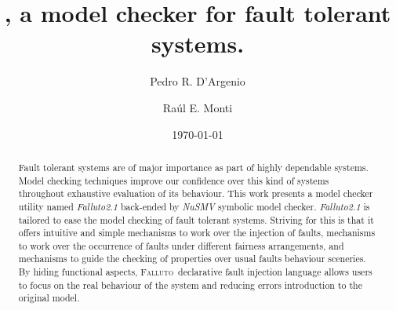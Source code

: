 \documentclass[12pt]{llncs2e/llncs}
\title{\falluto, a model checker for fault tolerant systems.}
\author{ Pedro R. D'Argenio \and Ra\'ul E. Monti}
\institute{FaMAF, Universidad Nacional de C\'ordoba -- CONICET}
\date{\today}
\newcommand{\fallutoSp}{\mbox{\textsc{Falluto~}}}
\begin{document}
\maketitle
\begin{abstract}
Fault tolerant systems are of major importance as part of highly dependable 
systems. Model checking techniques improve our confidence over this kind of
systems throughout exhaustive evaluation of its behaviour. This work presents
a model checker utility named \mbox{\textit{Falluto2.1}} back-ended by 
\mbox{\textit{NuSMV}} symbolic model checker. \mbox{\textit{Falluto2.1}} is
tailored to ease the model checking of fault tolerant systems. Striving for
this is that it offers intuitive and simple mechanisms to work over the 
injection of faults, mechanisms to work over the occurrence of faults under
different fairness arrangements, and mechanisms to guide the checking of 
properties over usual faults behaviour sceneries. By hiding functional
aspects, \fallutoSp declarative fault injection language
allows users to
focus on the real behaviour of the system and reducing errors introduction
to the original model.
\end{abstract}


\end{document}

